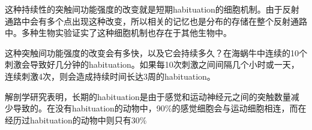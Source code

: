 \documentclass[UTF8,nofonts]{ctexart}
\begin{document}
\par
这种持续性的突触间功能强度的改变就是短期habituation的细胞机制。由于反射通路中会有多个点出现这种改变，所以相关的记忆也是分布的存储在整个反射通路中。多种生物实验证实了这种细胞机制也存在于其他生物中。
\par
这种突触间功能强度的改变会有多快，以及它会持续多久？在海蜗牛中连续的10个刺激会导致好几分钟的habituation。如果每10次刺激之间间隔几个小时或一天，连续刺激4次，则会造成持续时间长达3周的habituation。
\par
解剖学研究表明，长期的habituation是由于感觉和运动神经元之间的突触数量减少导致的。在没有habituation的动物中，90\%的感觉细胞会与运动细胞相连，而在经历过habituation的动物中则只有30\% 
\end{document}
